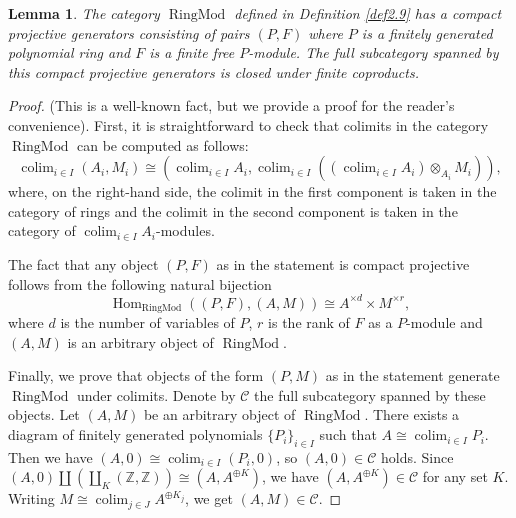 \documentclass[11pt, a4paper]{amsart}
\theoremstyle{plain}
\newtheorem{lemma}[theorem]{Lemma}
\theoremstyle{definition}
\begin{document}
\begin{lemma}\label{lem3.6}
    The category $\operatorname{RingMod}$ defined in Definition \ref{def2.9} has a compact projective generators consisting of pairs $(P,F)$ where $P$ is a finitely generated polynomial ring and $F$ is a finite free $P$-module. The full subcategory spanned by this compact projective generators is closed under finite coproducts.
\end{lemma}
\begin{proof}(This is a well-known fact, but we provide a proof for the reader's convenience).
    First, it is straightforward to check that colimits in the category $\operatorname{RingMod}$ can be computed as follows:\[\operatorname{colim}_{i\in I}(A_i,M_i)\cong (\operatorname{colim}_{i\in I}A_i,\operatorname{colim}_{i\in I}((\operatorname{colim}_{i\in I}A_i)\otimes _{A_i}M_i)),\] where, on the right-hand side, the colimit in the first component is taken in the category of rings and the colimit in the second component is taken in the category of $\operatorname{colim}_{i\in I}A_i$-modules. 

    The fact that any object $(P,F)$ as in the statement is compact projective follows from the following natural bijection \[\operatorname{Hom}_{\operatorname{RingMod}}((P,F),(A,M))\cong A^{\times d}\times M^{\times r},\] where $d$ is the number of variables of $P$, $r$ is the rank of $F$ as a $P$-module and $(A,M)$ is an arbitrary object of $\operatorname{RingMod}$.

    Finally, we prove that objects of the form $(P,M)$ as in the statement generate $\operatorname{RingMod}$ under colimits. Denote by $\mathscr C$ the full subcategory spanned by these objects. Let $(A,M)$ be an arbitrary object of $\operatorname{RingMod}$. There exists a diagram of finitely generated polynomials $\{P_i\}_{i\in I}$ such that $A\cong \operatorname{colim}_{i\in I}P_i$. Then we have $(A,0)\cong \operatorname{colim}_{i\in I}(P_i,0)$, so $(A,0)\in \mathscr C$ holds. Since $(A,0)\coprod(\coprod_{K}(\mathbb Z,\mathbb Z))\cong (A,A^{\oplus K})$, we have $(A,A^{\oplus K})\in \mathscr C$ for any set $K$. Writing $M\cong \operatorname{colim}_{j\in J}A^{\oplus K_j}$, we get $(A,M)\in \mathscr C$.
    
\end{proof}
\end{document}
